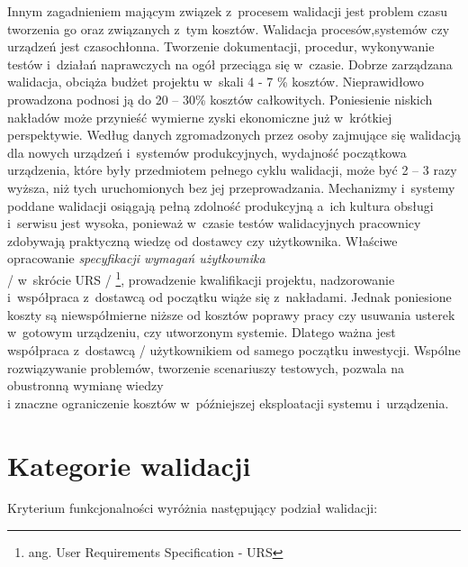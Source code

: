 \documentclass{xmgr}
\begin{document}
\indent \textcolor{sb}{Innym zagadnieniem mającym związek z~procesem walidacji jest problem czasu tworzenia go oraz związanych z~tym kosztów.} \textcolor{sa}{Walidacja procesów,systemów czy urządzeń jest czasochłonna. Tworzenie dokumentacji, procedur, wykonywanie testów i~działań naprawczych na ogół przeciąga się w~czasie.} \textcolor{sb}{Dobrze zarządzana walidacja, obciąża budżet projektu w~skali 4 - 7 \% kosztów.} \textcolor{sa}{Nieprawidłowo prowadzona podnosi ją do 20 – 30\% kosztów całkowitych.} \textcolor{sb}{Poniesienie niskich nakładów może przynieść wymierne zyski ekonomiczne już w~krótkiej perspektywie.} \textcolor{sa}{Według danych zgromadzonych przez osoby zajmujące się walidacją dla nowych urządzeń i~systemów produkcyjnych, wydajność początkowa urządzenia, które były przedmiotem pełnego cyklu walidacji, może być 2 – 3 razy wyższa, niż tych uruchomionych bez jej przeprowadzania.} \textcolor{sb}{Mechanizmy i~systemy poddane walidacji osiągają pełną zdolność produkcyjną a~ich kultura obsługi i~serwisu jest wysoka,} \textcolor{sa}{ponieważ w~czasie testów walidacyjnych pracownicy zdobywają praktyczną wiedzę od dostawcy czy użytkownika.} \textcolor{sb}{Właściwe opracowanie \textit{specyfikacji wymagań użytkownika}
\\
/ w~skrócie URS / \footnote{ang. User Requirements Specification - URS}, prowadzenie kwalifikacji projektu, nadzorowanie i~współpraca z~dostawcą} \textcolor{sa}{od początku wiąże się z~nakładami.} \textcolor{sb}{Jednak poniesione koszty są niewspółmierne niższe od kosztów poprawy pracy czy usuwania usterek w~gotowym urządzeniu, czy utworzonym systemie.} \textcolor{sa}{Dlatego ważna jest współpraca z~dostawcą / użytkownikiem  od samego początku inwestycji.} \textcolor{sb}{Wspólne rozwiązywanie problemów, tworzenie scenariuszy testowych,} \textcolor{sa}{pozwala na obustronną wymianę wiedzy
\\
i znaczne ograniczenie kosztów w~późniejszej eksploatacji systemu i~urządzenia.}\cite{ekonomia}

\section{Kategorie walidacji}

\textcolor{sb}{Kryterium funkcjonalności wyróżnia następujący podział walidacji:}
\end{document}
